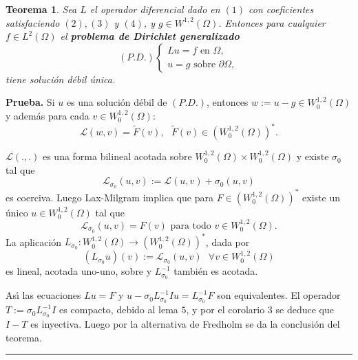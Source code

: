\documentclass{article}
\newtheorem{theorem}{Teorema}
\newenvironment{proof}[1][Prueba]{\textbf{#1.} }{\ \rule{0.5em}{0.5em}}
\begin{document}
\begin{theorem}
Sea $L$ el operador diferencial dado en $\left( 1\right) $ con coeficientes
satisfaciendo $\left( 2\right) ,\left( 3\right) $ y $\left( 4\right) $, y $%
g\in W^{1,2}\left( \Omega \right) $. Entonces para cualquier $f\in
L^{2}\left( \Omega \right) $ el \textbf{problema de Dirichlet generalizado} 
\begin{equation*}
\left( P.D.\right) \left\{ 
\begin{array}{c}
Lu=f\text{ \ en }\Omega , \\ 
u=g\text{ sobre }\partial \Omega ,
\end{array}
\right.
\end{equation*}
tiene soluci\'{o}n d\'{e}bil \'{u}nica.
\end{theorem}

\begin{proof}
Si $u$ es una soluci\'{o}n d\'{e}bil de $\left( P.D.\right) $, entonces $%
w:=u-g\in W_{0}^{1,2}\left( \Omega \right) $ y adem\'{a}s para cada $v\in
W_{0}^{1,2}\left( \Omega \right) :$%
\begin{equation*}
\mathcal{L}\left( w,v\right) =\widetilde{F}\left( v\right) ,\text{ \ }%
\widetilde{F}\left( v\right) \in \left( W_{0}^{1,2}\left( \Omega \right)
\right) ^{\ast }.
\end{equation*}

$\mathcal{L}\left( .,.\right) $ es una forma bilineal acotada sobre $%
W_{0}^{1,2}\left( \Omega \right) \times W_{0}^{1,2}\left( \Omega \right) $ y
existe $\sigma _{0}$ tal que 
\begin{equation*}
\mathcal{L}_{\sigma _{0}}\left( u,v\right) :=\mathcal{L}\left( u,v\right)
+\sigma _{0}\left( u,v\right)
\end{equation*}
es coerciva. Luego Lax-Milgram implica que para $F\in \left(
W_{0}^{1,2}\left( \Omega \right) \right) ^{\ast }$ existe un \'{u}nico $u\in
W_{0}^{1,2}\left( \Omega \right) $ tal que 
\begin{equation*}
\mathcal{L}_{\sigma _{0}}\left( u,v\right) =F\left( v\right) \text{ \ para
todo }v\in W_{0}^{1,2}\left( \Omega \right) .
\end{equation*}
La aplicaci\'{o}n $L_{\sigma _{0}}:W_{0}^{1,2}\left( \Omega \right)
\longrightarrow \left( W_{0}^{1,2}\left( \Omega \right) \right) ^{\ast }$,
dada por 
\begin{equation*}
(L_{\sigma _{0}}u)\left( v\right) :=\mathcal{L}_{\sigma _{0}}\left(
u,v\right) \text{ \ }\forall v\in W_{0}^{1,2}\left( \Omega \right)
\end{equation*}
es lineal, acotada uno-uno, sobre y $L_{\sigma _{0}}^{-1}$ tambi\'{e}n es
acotada.

As\'{\i} las ecuaciones $Lu=F$ y $u-\sigma _{0}L_{\sigma
_{0}}^{-1}Iu=L_{\sigma _{0}}^{-1}F$ son equivalentes. El operador $T:=\sigma
_{0}L_{\sigma _{0}}^{-1}I$ es compacto, debido al lema $5$, y por el
corolario $3$ se deduce que $I-T$ es inyectiva. Luego por la alternativa de
Fredholm se da la conclusi\'{o}n del teorema.
\end{proof}
\end{document}
